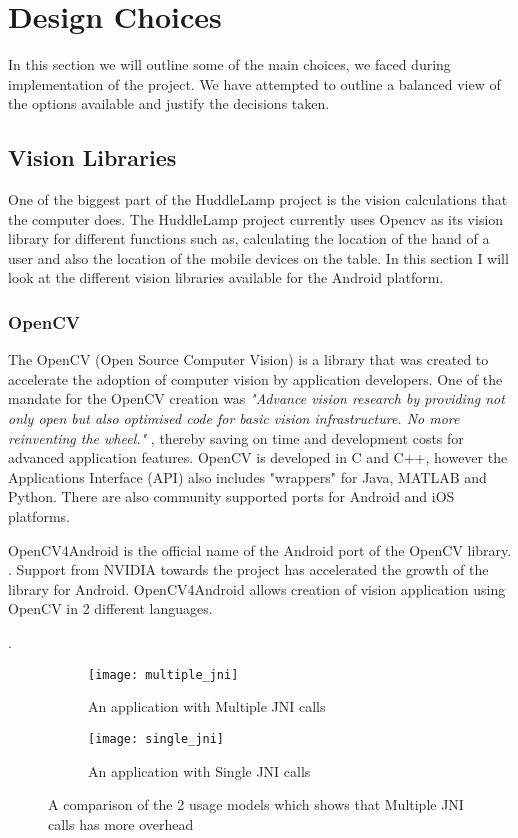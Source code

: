 
 
\section{Design Choices} \label{design_choice_android_camera}
In this section we will outline some of the main choices, we faced during implementation of the project. We have attempted to outline a balanced view of the options available and justify the decisions taken.
 
\subsection{Vision Libraries}
One of the biggest part of the HuddleLamp project is the vision calculations that the computer does. The HuddleLamp project currently uses Opencv as its vision library for different functions such as, calculating the location of the hand of a user and also the location of the mobile devices on the table. In this section I will look at the different vision libraries available for the Android platform.
 
\subsubsection{OpenCV} \label{opencv_section}
The OpenCV (Open Source Computer Vision) is a library that was created to accelerate the adoption of computer vision by application developers. One of the mandate for the OpenCV creation was \emph{"Advance vision research by providing not only open but also optimised code for basic vision infrastructure. No more reinventing the wheel."}
\cite{opencv_wiki}, thereby saving on time and development costs for advanced application features. 
OpenCV is developed in C and C++, however the Applications Interface (API) also includes "wrappers" for Java, MATLAB and Python. There are also community supported ports for Android and iOS platforms.

OpenCV4Android is the official name of the Android port of the OpenCV library. 
\cite{opencv4android_link}. 
Support from NVIDIA towards the project has accelerated the growth of the library for Android. OpenCV4Android allows creation of vision application using OpenCV in 2  different languages.

\cite{opencv_usage_model}. 
\begin{figure}[H]
    \centering
    \begin{subfigure}[b]{0.47\textwidth}
        \centering
        \texttt{[image: multiple\_jni]}
        \caption{An application with Multiple JNI calls}
    \end{subfigure}
    \hfill
    \begin{subfigure}[b]{0.47\textwidth}
        \centering
        \texttt{[image: single\_jni]}
        \caption{An application with Single JNI calls}
    \end{subfigure}
    \hfill
    \caption{A comparison of the 2 usage models which shows that Multiple JNI calls has more overhead\cite{opencv_jni_images}}
     \label{two_usage_models}
\end{figure}


